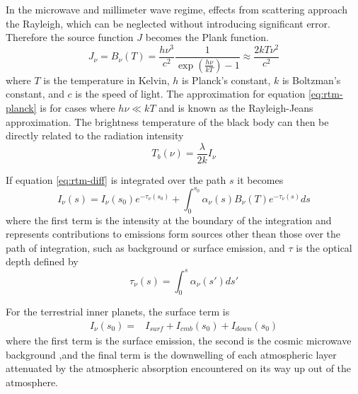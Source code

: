 In the microwave and millimeter wave regime, effects from scattering approach the Rayleigh, which can be neglected without introducing significant error. Therefore the source function $J$ becomes the Plank function.
\begin{equation}\label{eq:rtm-planck}
J_\nu = B_\nu(T) = \frac{h\nu^3}{c^2} \frac{1}{\exp(\frac{h\nu}{kT})-1} \approx \frac{2kT\nu^2}{c^2}
\end{equation}
where $T$ is the temperature in Kelvin, $h$ is Planck's constant, $k$ is Boltzman's constant, and $c$ is the speed of light. The approximation for equation \ref{eq:rtm-planck} is for cases where $h\nu \ll kT$ and is known as the Rayleigh-Jeans approximation. The brightness temperature of the black body can then be directly related to the radiation intensity
\begin{equation}\label{eq:temp-intensity}
T_b(\nu) = \frac{\lambda}{2k}I_\nu
\end{equation}

If equation \ref{eq:rtm-diff} is integrated over the path $s$ it becomes
\begin{equation}\label{eq:rtm-integrated}
I_\nu(s) = I_{\nu}(s_0)e^{-\tau_\nu(s_0)}+\int_0^{s_0} \alpha_\nu(s)B_\nu(T) e^{-\tau_\nu(s)}ds 
\end{equation}
where the first term is the intensity at the boundary of the integration and represents contributions to emissions form sources other thean those over the path of integration, such as background or surface emission, and $\tau$ is the optical depth defined by
\begin{equation}\label{eq:rtm-tau}
\tau_\nu(s) = \int_0^s \alpha_\nu(s') ds'
\end{equation}

For the terrestrial inner planets, the surface term is 
\begin{equation}\label{eq:rtm-surface-term}
\begin{split}
I_{\nu}(s_0) =& I_{surf} + I_{cmb}(s_0)+ I_{down}(s_0)
\end{split}
\end{equation}
where the first term is the surface emission, the second is the cosmic microwave background ,and the final term is the downwelling of each atmospheric layer attenuated by the atmospheric absorption encountered on its way up out of the atmosphere. 

